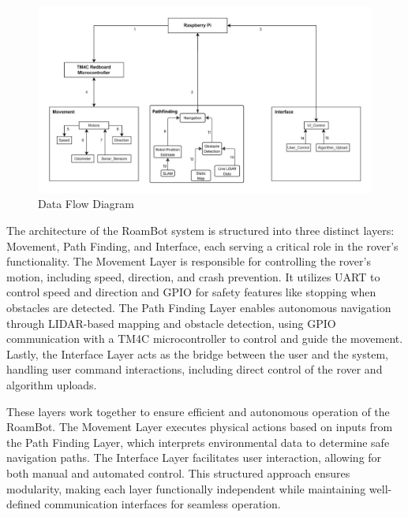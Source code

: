 
\begin{figure}[h!]
	\centering
 	\includegraphics[width=1\textwidth]{images/data_flow_2nd.jpeg}
 \caption{Data Flow Diagram}
\end{figure}

The architecture of the RoamBot system is structured into three distinct layers: Movement, Path Finding, and Interface, each serving a critical role in the rover's functionality. The Movement Layer is responsible for controlling the rover's motion, including speed, direction, and crash prevention. It utilizes UART to control speed and direction and GPIO for safety features like stopping when obstacles are detected. The Path Finding Layer enables autonomous navigation through LIDAR-based mapping and obstacle detection, using GPIO communication with a TM4C microcontroller to control and guide the movement. Lastly, the Interface Layer acts as the bridge between the user and the system, handling user command interactions, including direct control of the rover and algorithm uploads.

These layers work together to ensure efficient and autonomous operation of the RoamBot. The Movement Layer executes physical actions based on inputs from the Path Finding Layer, which interprets environmental data to determine safe navigation paths. The Interface Layer facilitates user interaction, allowing for both manual and automated control. This structured approach ensures modularity, making each layer functionally independent while maintaining well-defined communication interfaces for seamless operation.
